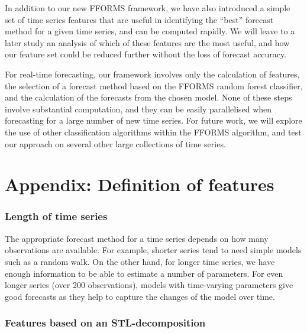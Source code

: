 \documentclass[11pt,a4paper,]{article}
\theoremstyle{definition}
\theoremstyle{definition}
\theoremstyle{definition}
\theoremstyle{remark}
\begin{document}
In addition to our new FFORMS framework, we have also introduced a
simple set of time series features that are useful in identifying the
``best'' forecast method for a given time series, and can be computed
rapidly. We will leave to a later study an analysis of which of these
features are the most useful, and how our feature set could be reduced
further without the loss of forecast accuracy.

For real-time forecasting, our framework involves only the calculation
of features, the selection of a forecast method based on the FFORMS
random forest classifier, and the calculation of the forecasts from the
chosen model. None of these steps involve substantial computation, and
they can be easily parallelised when forecasting for a large number of
new time series. For future work, we will explore the use of other
classification algorithms within the FFORMS algorithm, and test our
approach on several other large collections of time series.

\hypertarget{appendix-definition-of-features}{%
\section*{Appendix: Definition of
features}\label{appendix-definition-of-features}}

\hypertarget{length-of-time-series}{%
\subsubsection*{Length of time series}\label{length-of-time-series}}

The appropriate forecast method for a time series depends on how many
observations are available. For example, shorter series tend to need
simple models such as a random walk. On the other hand, for longer time
series, we have enough information to be able to estimate a number of
parameters. For even longer series (over 200 observations), models with
time-varying parameters give good forecasts as they help to capture the
changes of the model over time.

\hypertarget{features-based-on-an-stl-decomposition}{%
\subsubsection*{Features based on an
STL-decomposition}\label{features-based-on-an-stl-decomposition}}
\end{document}
